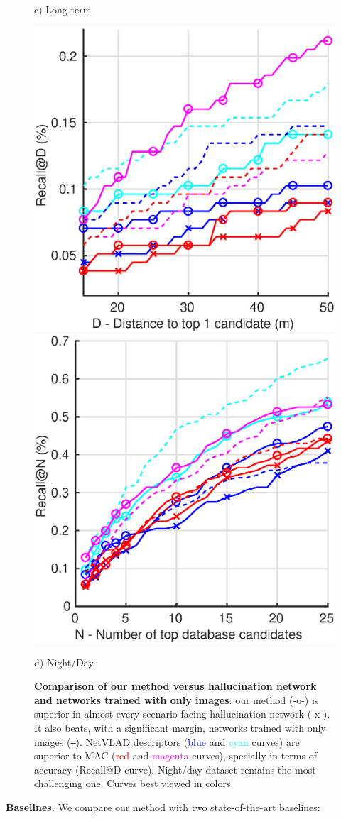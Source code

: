 \begin{figure}
\begin{minipage}{0.85\linewidth}
\begin{minipage}{0.49\linewidth}
		{\scriptsize c) Long-term}		
	\end{minipage}
	\begin{minipage}{0.49\linewidth}
		\center	
		\includegraphics[width=0.49\linewidth]{plot/fig/night_distance}	
		\includegraphics[width=0.49\linewidth]{plot/fig/night_recall}
	
		{\scriptsize d) Night/Day}
	\end{minipage}
	
	\end{minipage}

	\caption{\label{fig:results} \textbf{Comparison of our method versus hallucination network and networks trained with only images}: our method (-o-) is superior in almost every scenario facing hallucination network (-x-). It also beats, with a significant margin, networks trained with only images (\texttt{--}). NetVLAD descriptors (\textcolor{blue}{blue} and \textcolor{cyan}{cyan} curves) are superior to MAC (\textcolor{red}{red} and \textcolor{magenta}{magenta} curves), specially in terms of accuracy (Recall@D curve). Night/day dataset remains the most challenging one. Curves best viewed in colors.}
\end{figure}

\noindent\textbf{Baselines.} We compare our method with two state-of-the-art baselines:
